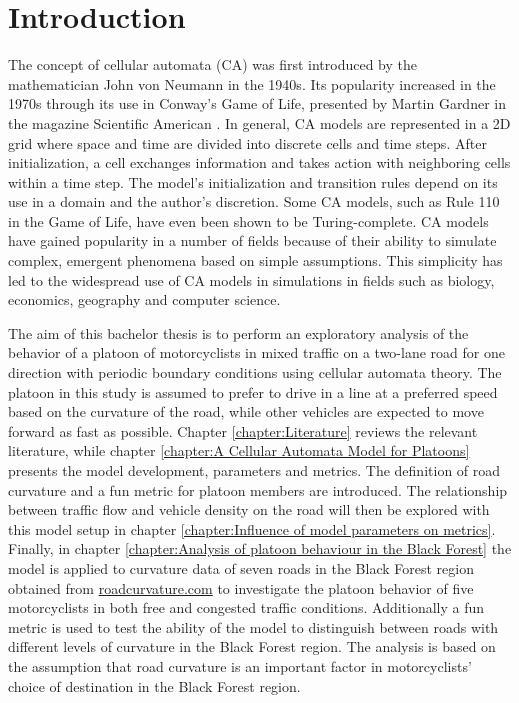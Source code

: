 \chapter{Introduction}

The concept of cellular automata (CA) was first introduced by the mathematician John von Neumann\cite{Neumann} in the 1940s. Its popularity increased in the 1970s through its use in Conway's Game of Life, presented by Martin Gardner in the magazine Scientific American \cite{10.2307/24927642}. In general, CA models are represented in a 2D grid where space and time are divided into discrete cells and time steps. After initialization, a cell exchanges information and takes action with neighboring cells within a time step. The model's initialization and transition rules depend on its use in a domain and the author's discretion. Some CA models, such as Rule 110 in the Game of Life, have even been shown to be Turing-complete. CA models have gained popularity in a number of fields because of their ability to simulate complex, emergent phenomena based on simple assumptions. This simplicity has led to the widespread use of CA models in simulations in fields such as biology, economics, geography and computer science.


The aim of this bachelor thesis is to perform an exploratory analysis of the behavior of a platoon of motorcyclists in mixed traffic on a two-lane road for one direction with periodic boundary conditions using cellular automata theory. The platoon in this study is assumed to prefer to drive in a line at a preferred speed based on the curvature of the road, while other vehicles are expected to move forward as fast as possible. Chapter \ref{chapter:Literature} reviews the relevant literature, while chapter \ref{chapter:A Cellular Automata Model for Platoons} presents the model development, parameters and metrics. The definition of road curvature and a fun metric for platoon members are introduced. The relationship between traffic flow and vehicle density on the road will then be explored with this model setup in chapter \ref{chapter:Influence of model parameters on metrics}. Finally, in chapter \ref{chapter:Analysis of platoon behaviour in the Black Forest} the model is applied to curvature data of seven roads in the Black Forest region obtained from \hyperlink{https://roadcurvature.com/}{roadcurvature.com} to investigate the platoon behavior of five motorcyclists in both free and congested traffic conditions. Additionally a fun metric is used to test the ability of the model to distinguish between roads with different levels of curvature in the Black Forest region. The analysis is based on the assumption that road curvature is an important factor in motorcyclists' choice of destination in the Black Forest region.




